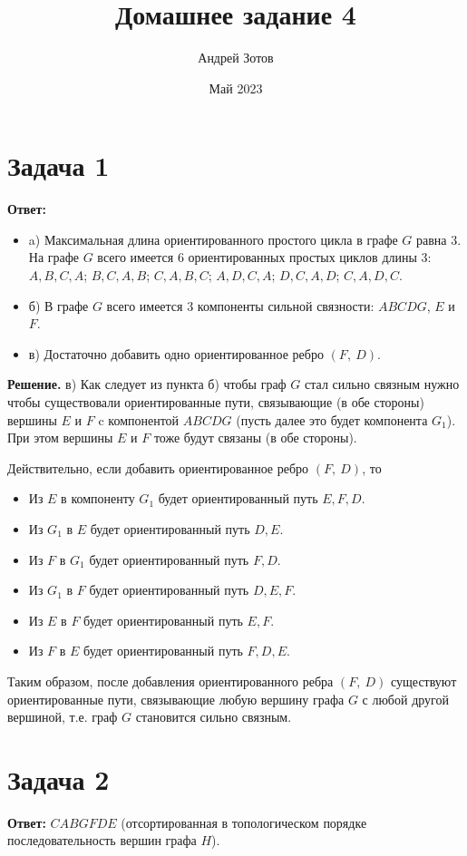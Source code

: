 \documentclass{article}
\title{Домашнее задание 4}
\author{Андрей Зотов}
\date{Май 2023}
\begin{document}
\maketitle

\section*{Задача 1}
{\bf Ответ:} 
\begin{itemize}
\item a) Максимальная длина ориентированного простого цикла в графе $G$ равна 3. На графе $G$ всего имеется 6 ориентированных простых циклов длины 3: $A,B,C,A$; $B,C,A,B$; $C,A,B,C$; $A,D,C,A$; $D,C,A,D$; $C,A,D,C$. 
\item б) В графе $G$ всего имеется 3 компоненты сильной связности: $ABCDG$, $E$ и $F$.
\item в) Достаточно добавить одно ориентированное ребро $(F,\ D)$. 
\end{itemize}
{\bf Решение.} в) Как следует из пункта б) чтобы граф $G$ стал сильно связным нужно чтобы существовали ориентированные пути, связывающие (в обе стороны) вершины $E$ и $F$ c компонентой $ABCDG$ (пусть далее это будет компонента $G_1$). При этом вершины $E$ и $F$ тоже будут связаны (в обе стороны). 
\par
Действительно, если добавить ориентированное ребро $(F,\ D)$, то 
\begin{itemize} 
\item Из $E$ в компоненту $G_1$ будет ориентированный путь $E,F,D$. 
\item Из  $G_1$ в $E$ будет ориентированный путь $D,E$.
\item Из $F$ в $G_1$ будет ориентированный путь $F,D$.
\item Из $G_1$ в $F$ будет ориентированный путь $D,E,F$.
\item Из $E$ в $F$ будет ориентированный путь $E,F$.
\item Из $F$ в $E$ будет ориентированный путь $F,D,E$.
\end{itemize}
\par
Таким образом, после добавления ориентированного ребра $(F,\ D)$ существуют ориентированные пути, связывающие любую вершину графа $G$ с любой другой вершиной, т.е. граф $G$ становится сильно связным.
\section*{Задача 2}
{\bf Ответ:} $CABGFDE$ (отсортированная в топологическом порядке последовательность вершин графа $H$).
\end{document}
